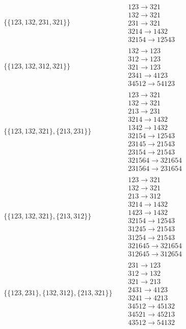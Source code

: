 \begin{tiny}
\begin{align}
\begin{matrix}
\end{matrix}
\\
\{\{123, 132, 231, 321\}\}
\quad
&
\begin{matrix}
123 \to 321\\132 \to 321\\231 \to 321\\3214 \to 1432\\32154 \to 12543
\end{matrix}
\\
\{\{123, 132, 312, 321\}\}
\quad
&
\begin{matrix}
132 \to 123\\312 \to 123\\321 \to 123\\2341 \to 4123\\34512 \to 54123
\end{matrix}
\\
\{\{123, 132, 321\}, \{213, 231\}\}
\quad
&
\begin{matrix}
123 \to 321\\132 \to 321\\213 \to 231\\3214 \to 1432\\1342 \to 1432\\32154 \to 12543\\23145 \to 21543\\23154 \to 21543\\321564 \to 321654\\231564 \to 231654
\end{matrix}
\\
\{\{123, 132, 321\}, \{213, 312\}\}
\quad
&
\begin{matrix}
123 \to 321\\132 \to 321\\213 \to 312\\3214 \to 1432\\1423 \to 1432\\32154 \to 12543\\31245 \to 21543\\31254 \to 21543\\321645 \to 321654\\312645 \to 312654
\end{matrix}
\\
\{\{123, 231\}, \{132, 312\}, \{213, 321\}\}
\quad
&
\begin{matrix}
231 \to 123\\312 \to 132\\321 \to 213\\2431 \to 4123\\3241 \to 4213\\34512 \to 45132\\34521 \to 45213\\43512 \to 54132

\end{matrix}
\end{align}
\end{tiny}
